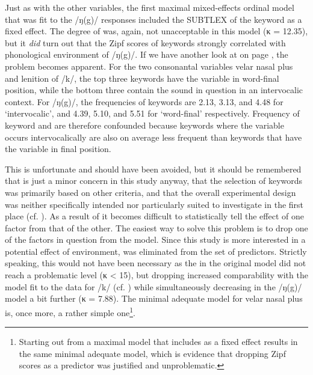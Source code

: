 Just as with the other variables, the first maximal mixed-effects ordinal model that was fit to the /ŋ(g)/ responses included the SUBTLEX  of the keyword as a fixed effect.
The degree of  was, again, not unacceptable in this model (κ = 12.35), but it \emph{did} turn out that the Zipf scores of keywords strongly correlated with phonological environment of /ŋ(g)/.
If we have another look at  on page \pageref{tab.keywords.frequency}, the problem becomes apparent.
For the two consonantal variables velar nasal plus and lenition of /k/, the top three keywords have the variable in word-final position, while the bottom three contain the sound in question in an intervocalic context.
For /ŋ(g)/, the frequencies of keywords are 2.13, 3.13, and 4.48 for `intervocalic', and 4.39, 5.10, and 5.51 for `word-final' respectively.
Frequency of keyword and  are therefore confounded because keywords where the variable occurs intervocalically are also on average less frequent than keywords that have the variable in final position.

This is unfortunate and should have been avoided, but it should be remembered that  is just a minor concern in this study anyway, that the selection of keywords was primarily based on other criteria, and that the overall experimental design was neither specifically intended nor particularly suited to investigate  in the first place (cf. ).
As a result of  it becomes difficult to statistically tell the effect of one factor from that of the other.
The easiest way to solve this problem is to drop one of the factors in question from the model.
Since this study is more interested in a potential effect of environment,  was eliminated from the set of predictors.
Strictly speaking, this would not have been necessary as the  in the original model did not reach a problematic level (κ < 15), but dropping  increased comparability with the model fit to the data for /k/ (cf. ) while simultaneously decreasing  in the /ŋ(g)/ model a bit further (κ = 7.88).
The minimal adequate model for velar nasal plus is, once more, a rather simple one\footnote{Starting out from a maximal model that includes  as a fixed effect results in the same minimal adequate model, which is evidence that dropping Zipf scores as a predictor was justified and unproblematic.}.

